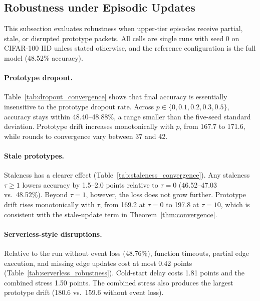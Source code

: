 

\subsection{Robustness under Episodic Updates}
This subsection evaluates robustness when upper-tier episodes receive partial, stale, or disrupted prototype packets. All cells are single runs with seed 0 on CIFAR-100 IID unless stated otherwise, and the reference configuration is the full \ehsfp model (48.52\% accuracy).

\paragraph{Prototype dropout.} Table~\ref{tab:dropout_convergence} shows that final accuracy is essentially insensitive to the prototype dropout rate. Across $p\in\{0,0.1,0.2,0.3,0.5\}$, accuracy stays within 48.40--48.88\%, a range smaller than the five-seed standard deviation. Prototype drift increases monotonically with $p$, from 167.7 to 171.6, while rounds to convergence vary between 37 and 42.

\paragraph{Stale prototypes.} Staleness has a clearer effect (Table~\ref{tab:staleness_convergence}). Any staleness $\tau\geq1$ lowers accuracy by 1.5--2.0 points relative to $\tau=0$ (46.52--47.03 vs.\ 48.52\%). Beyond $\tau=1$, however, the loss does not grow further. Prototype drift rises monotonically with $\tau$, from 169.2 at $\tau=0$ to 197.8 at $\tau=10$, which is consistent with the stale-update term in Theorem~\ref{thm:convergence}.

\paragraph{Serverless-style disruptions.} Relative to the run without event loss (48.76\%), function timeouts, partial edge execution, and missing edge updates cost at most 0.42 points (Table~\ref{tab:serverless_robustness}). Cold-start delay costs 1.81 points and the combined stress 1.50 points. The combined stress also produces the largest prototype drift (180.6 vs.\ 159.6 without event loss).

